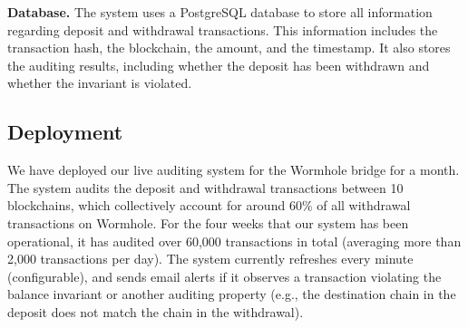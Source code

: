 




\textbf{Database.}
%
The system uses a PostgreSQL database to store all information
regarding deposit and withdrawal transactions. This information
includes the transaction hash, the blockchain, the amount, and the
timestamp.  It also stores the auditing results, including whether the
deposit has been withdrawn and whether the invariant is
violated.


\subsection{Deployment}
%
We have deployed our live auditing system for the Wormhole bridge for a month.
The system audits the deposit and withdrawal transactions between 10
blockchains, which collectively account for around 60\% of all
withdrawal transactions on Wormhole.  For the four weeks that our
system has been operational, it has audited over 60,000 transactions
in total (averaging more than 2,000 transactions per day). The system
currently refreshes every minute (configurable), and sends email
alerts if it observes a transaction violating the balance invariant or
another auditing property (e.g., the destination chain in the deposit
does not match the chain in the withdrawal).

